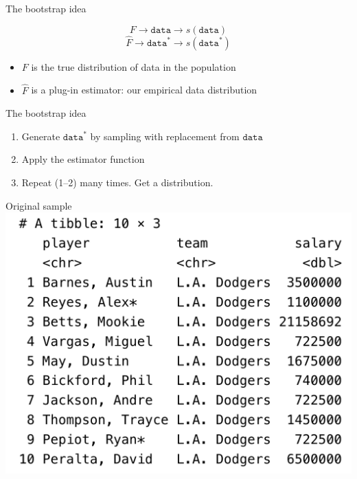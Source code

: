 \documentclass{beamer}
\begin{document}
\begin{frame}{The bootstrap idea}

$$F\rightarrow \texttt{data} \rightarrow s(\texttt{data})$$ \pause
$$\hat{F}\rightarrow \texttt{data}^* \rightarrow s(\texttt{data}^*)$$ \pause

\begin{itemize}
\item $F$ is the true distribution of data in the population
\item $\hat{F}$ is a plug-in estimator: our empirical data distribution
\end{itemize}

\end{frame}

\begin{frame}{The bootstrap idea}

\begin{enumerate}
\item Generate $\texttt{data}^*$ by sampling with replacement from $\texttt{data}$
\item Apply the estimator function
\item Repeat (1--2) many times. Get a distribution.
\end{enumerate}

\end{frame}

\begin{frame}{Original sample}
\includegraphics[width = .7\textwidth]{figures/original_sample}
\end{frame}
\end{document}
